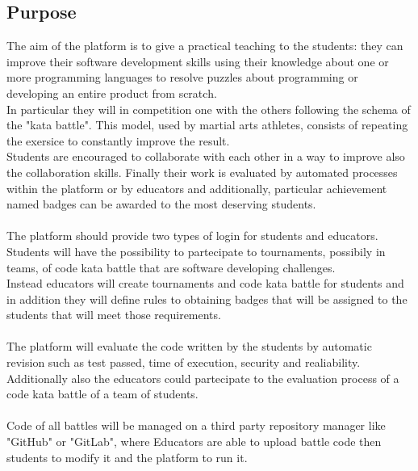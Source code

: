 \subsection{Purpose}
The aim of the platform is to give a practical teaching to the students: they can improve their software development skills using their knowledge about one or
more programming languages to resolve puzzles about programming or developing an entire product from scratch.\\ 
In particular they will in competition one with the others following the schema of the "kata battle". This model, used by martial arts athletes, consists of repeating the exersice to constantly improve the result.\\ 
Students are encouraged to collaborate with each other in a way to improve also the collaboration skills. Finally their work is evaluated by automated processes within the platform or by educators and additionally, particular achievement named badges can be awarded to the most deserving students.\\
\\
The platform should provide two types of login for students and educators.\\
Students will have the possibility to partecipate to tournaments, possibily in teams, of code kata battle that are software developing challenges.\\ 
Instead educators will create tournaments and code kata battle for students and in addition they will define rules to obtaining badges that will be assigned to the students that will meet those requirements.\\
\\
The platform will evaluate the code written by the students by automatic revision such as test passed, time of execution, security and realiability. Additionally also the educators could partecipate to the evaluation process of a code
kata battle of a team of students.\\
\\
Code of all battles will be managed on a third party repository manager like "GitHub" or "GitLab", where Educators are able to upload battle code then students to modify it and the platform to run it.


